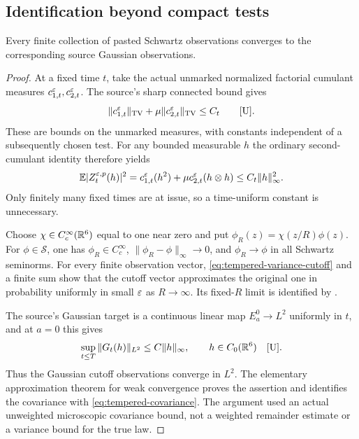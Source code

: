 \subsection{Identification beyond compact tests}

\begin{lemma}\label{lem:tempered-fdd}
Every finite collection of pasted Schwartz observations converges
to the corresponding source Gaussian observations.
\end{lemma}
\begin{proof}
At a fixed time $t$, take the actual unmarked normalized factorial
cumulant measures $c_{1,t}^\varepsilon,c_{2,t}^\varepsilon$.
The source's sharp connected bound gives
\[
 \|c_{1,t}^\eps\|_{\TV}+\mu\|c_{2,t}^\eps\|_{\TV}\leq C_t
 \qquad\text{\cite[\S6, Sharp connected bounds]{U}}.
\]
These are bounds on the unmarked measures, with constants independent
of a subsequently chosen test. For any bounded measurable $h$ the
ordinary second-cumulant identity therefore yields
\begin{equation}\label{eq:tempered-variance-cutoff}
 \mathbb E|Z_t^{\varepsilon,p}(h)|^2
 =c_{1,t}^\varepsilon(h^2)+\mu c_{2,t}^\varepsilon(h\otimes h)
 \leq C_t\|h\|_\infty^2.
\end{equation}
Only finitely many fixed times are at issue, so a time-uniform
constant is unnecessary.

Choose $\chi\in C_c^\infty(\mathbb R^6)$ equal to one near zero and put
$\phi_R(z)=\chi(z/R)\phi(z)$.
For $\phi\in\mathcal S$, one has
$\phi_R\in C_c^\infty$, $\|\phi_R-\phi\|_\infty\to0$, and
$\phi_R\to\phi$ in all Schwartz seminorms.
For every finite observation vector,
\eqref{eq:tempered-variance-cutoff} and a finite sum show that the
cutoff vector approximates the original one in probability uniformly
in small $\varepsilon$ as $R\to\infty$.
Its fixed-$R$ limit is identified by .

The source's Gaussian target is a continuous linear map
$E_a^0\to L^2$ uniformly in $t$, and at $a=0$ this gives
\begin{equation}\label{eq:tempered-target-bound}
 \sup_{t\leq T}\|G_t(h)\|_{L^2}\leq C\|h\|_\infty,
 \qquad h\in C_0(\R^6)
 \quad\text{\cite[\S2, Gaussian target]{U}}.
\end{equation}
Thus the Gaussian cutoff observations converge in $L^2$.
The elementary approximation theorem for weak convergence proves
the assertion and identifies the covariance with
\eqref{eq:tempered-covariance}.
The argument used an actual unweighted microscopic covariance bound,
not a weighted remainder estimate or a variance bound for the true law.
\end{proof}

